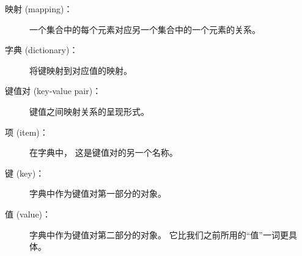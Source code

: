 \begin{description}


\item[映射 (mapping)：] 一个集合中的每个元素对应另一个集合中的一个元素的关系。



\item[字典 (dictionary)：] 将键映射到对应值的映射。



\item[键值对 (key-value pair)：] 键值之间映射关系的呈现形式。



\item[项 (item)：] 在字典中， 这是键值对的另一个名称。



\item[键 (key)：] 字典中作为键值对第一部分的对象。


\item[值 (value)：] 字典中作为键值对第二部分的对象。  它比我们之前所用的``值''一词更具体。




\end{description}
